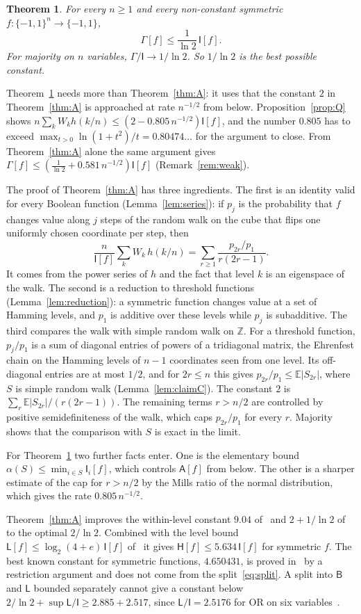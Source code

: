 \documentclass[11pt]{amsart}
\newtheorem{mainthm}{Theorem}
\theoremstyle{remark}
\newcommand{\bits}{\{-1,1\}}
\newcommand{\E}{\mathbb E}
\newcommand{\HH}{\mathsf H}
\newcommand{\I}{\mathsf I}
\begin{document}
\begin{mainthm}\label{thm:B}
For every $n\ge1$ and every non-constant symmetric $f:\bits^n\to\bits$,
\[
 \Gamma[f]\le\frac{1}{\ln2}\,\I[f].
\]
For majority on $n$ variables, $\Gamma/\I\to1/\ln2$. So $1/\ln2$ is the best possible constant.
\end{mainthm}

Theorem~\ref{thm:B} needs more than Theorem~\ref{thm:A}: it uses that the constant $2$ in Theorem~\ref{thm:A} is approached at rate $n^{-1/2}$ from below. Proposition~\ref{prop:Q} shows $n\sum_kW_kh(k/n)\le(2-0.805\,n^{-1/2})\I[f]$, and the number $0.805$ has to exceed $\max_{t>0}\ln(1+t^2)/t=0.80474\dots$ for the argument to close. From Theorem~\ref{thm:A} alone the same argument gives $\Gamma[f]\le(\frac1{\ln2}+0.581\,n^{-1/2})\I[f]$ (Remark~\ref{rem:weak}).

The proof of Theorem~\ref{thm:A} has three ingredients. The first is an identity valid for every Boolean function (Lemma~\ref{lem:series}): if $p_j$ is the probability that $f$ changes value along $j$ steps of the random walk on the cube that flips one uniformly chosen coordinate per step, then
\[
 \frac{n}{\I[f]}\sum_kW_k\,h(k/n)=\sum_{r\ge1}\frac{p_{2r}/p_1}{r(2r-1)}.
\]
It comes from the power series of $h$ and the fact that level $k$ is an eigenspace of the walk. The second is a reduction to threshold functions (Lemma~\ref{lem:reduction}): a symmetric function changes value at a set of Hamming levels, and $p_1$ is additive over these levels while $p_j$ is subadditive. The third compares the walk with simple random walk on $\mathbb Z$. For a threshold function, $p_j/p_1$ is a sum of diagonal entries of powers of a tridiagonal matrix, the Ehrenfest chain on the Hamming levels of $n-1$ coordinates seen from one level. Its off-diagonal entries are at most $1/2$, and for $2r\le n$ this gives $p_{2r}/p_1\le\E|S_{2r}|$, where $S$ is simple random walk (Lemma~\ref{lem:claimC}). The constant $2$ is $\sum_r\E|S_{2r}|/(r(2r-1))$. The remaining terms $r>n/2$ are controlled by positive semidefiniteness of the walk, which caps $p_{2r}/p_1$ for every $r$. Majority shows that the comparison with $S$ is exact in the limit.

For Theorem~\ref{thm:B} two further facts enter. One is the elementary bound $\alpha(S)\le\min_{i\in S}\I_i[f]$, which controls $\mathsf A[f]$ from below. The other is a sharper estimate of the cap for $r>n/2$ by the Mills ratio of the normal distribution, which gives the rate $0.805\,n^{-1/2}$.

Theorem~\ref{thm:A} improves the within-level constant $9.04$ of~\cite[Theorem~4]{OWZ11} and $2+1/\ln2$ of~\cite{Shm26b} to the optimal $2/\ln2$. Combined with the level bound $\mathsf L[f]\le\log_2(4+e)\,\I[f]$ of~\cite[Lemma~2.1]{Shm26} it gives $\HH[f]\le5.634\,\I[f]$ for symmetric $f$. The best known constant for symmetric functions, $4.650431$, is proved in~\cite{Shm26b} by a restriction argument and does not come from the split~\eqref{eq:split}. A split into $\mathsf B$ and $\mathsf L$ bounded separately cannot give a constant below $2/\ln2+\sup\mathsf L/\I\ge2.885+2.517$, since $\mathsf L/\I=2.5176$ for OR on six variables~\cite{Shm26b}.
\end{document}
